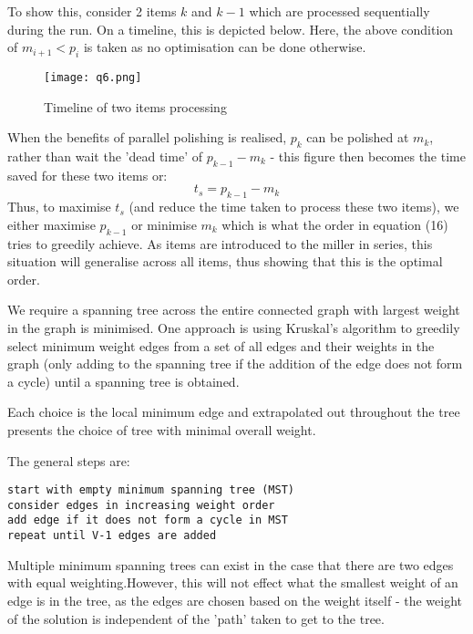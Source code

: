 \documentclass[11pt, a4paper]{article}
\begin{document}
{{{To show this, consider 2 items $k$ and $k-1$ which are processed sequentially during the run. On a timeline, this is depicted below. Here, the above condition of $m_{i+1} < p_i$ is taken as no optimisation can be done otherwise.
\begin{figure}[ht!]
\centering
\texttt{[image: q6.png]}
\caption{Timeline of two items processing\label{overflow}}
\end{figure}

When the benefits of parallel polishing is realised, $p_k$ can be polished at $m_k$, rather than wait the 'dead time' of $p_{k-1}-m_k$ - this figure then becomes the time saved for these two items or:
\[t_s = p_{k-1} - m_k \]
Thus, to maximise $t_s$ (and reduce the time taken to process these two items), we either maximise $p_{k-1}$ or minimise $m_k$ which is what the order in equation (16) tries to greedily achieve.
As items are introduced to the miller in series, this situation will generalise across all items, thus showing that this is the optimal order.




We require a spanning tree across the entire connected graph with largest weight in the graph is minimised.
One approach is using Kruskal's algorithm to greedily select minimum weight edges from a set of all edges and their weights in the graph (only adding to the spanning tree if the addition of the edge does not form a cycle) until a spanning tree is obtained.

Each choice is the local minimum edge and extrapolated out throughout the tree presents the choice of tree with minimal overall weight.

The general steps are:
\begin{lstlisting}[frame=single]
start with empty minimum spanning tree (MST)
consider edges in increasing weight order
add edge if it does not form a cycle in MST
repeat until V-1 edges are added
\end{lstlisting}

Multiple minimum spanning trees can exist in the case that there are two edges with equal weighting.However, this will not effect what the smallest weight of an edge is in the tree, as the edges are chosen based on the weight itself - the weight of the solution is independent of the 'path' taken to get to the tree.

}}}
\end{document}
